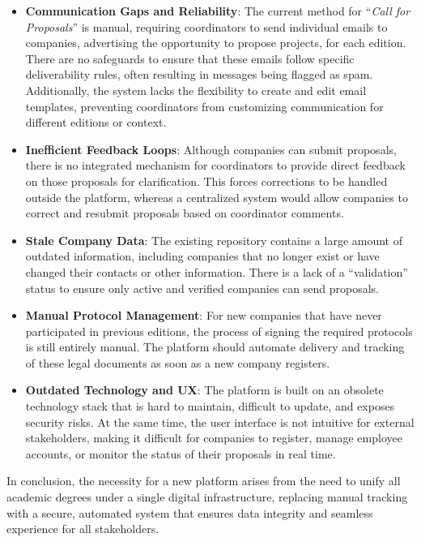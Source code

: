   \begin{itemize}
    \item {\textbf{Communication Gaps and Reliability}: The current method for “\textit{Call for Proposals}” is manual, 
      requiring coordinators to send individual emails to companies, advertising the opportunity to propose projects, 
      for each edition. There are no safeguards to ensure that these emails follow specific deliverability rules, 
      often resulting in messages being flagged as spam. Additionally, the system lacks the flexibility to 
      create and edit email templates, preventing coordinators from customizing communication for different 
      editions or context.}
    \item {\textbf{Inefficient Feedback Loops}: Although companies can submit proposals, there is no integrated mechanism 
      for coordinators to provide direct feedback on those proposals for clarification. 
      This forces corrections to be handled outside the platform, whereas a centralized system would allow companies 
      to correct and resubmit proposals based on coordinator comments.}
    \item {\textbf{Stale Company Data}: The existing repository contains a large amount of outdated information, 
      including companies that no longer exist or have changed their contacts or other information. 
      There is a lack of a “validation” status to ensure only active and verified companies can send proposals.}
    \item {\textbf{Manual Protocol Management}: For new companies that have never participated in previous editions, 
      the process of signing the required protocols is still entirely manual. The platform should automate 
      delivery and tracking of these legal documents as soon as a new company registers.}
    \item {
      \textbf{Outdated Technology and \gls{UX}}: The platform is built on an obsolete technology stack that is hard
      to maintain, difficult to update, and exposes security risks. 
      At the same time, the user interface is not intuitive for external stakeholders, making it 
      difficult for companies to register, manage employee accounts, or monitor the status 
      of their proposals in real time.
    }
  \end{itemize}

  {  
    In conclusion, the necessity for a new platform arises from the need to unify all academic degrees under a 
    single digital infrastructure, replacing manual tracking with a secure, automated system that ensures data 
    integrity and seamless experience for all stakeholders.
  }

